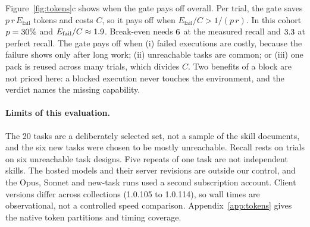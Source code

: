 Figure~\ref{fig:tokens}c shows when the gate pays off overall. Per trial, the
gate saves $p\,r\,E_{\mathrm{fail}}$ tokens and costs $C$, so it pays off when
$E_{\mathrm{fail}}/C > 1/(p\,r)$. In this cohort $p=30\%{}$ and
$E_{\mathrm{fail}}/C \approx 1.9$. Break-even needs
$6$ at the measured recall and $3.3$ at
perfect recall. The gate pays off when (i) failed executions are costly,
because the failure shows only after long work; (ii) unreachable tasks are
common; or (iii) one pack is reused across many trials, which divides $C$.
Two benefits of a block are not priced here: a blocked execution never
touches the environment, and the verdict names the missing capability.

\paragraph{Limits of this evaluation.}
The 20 tasks are a deliberately selected set, not a sample of the
\PilotSourceCount{} skill documents, and the six new tasks were chosen to be
mostly unreachable. Recall rests on \ValueFailed{} trials on six unreachable
task designs. Five repeats of one task are not independent skills. The hosted
models and their server revisions are outside our control, and the Opus,
Sonnet and new-task runs used a second subscription account. Client versions differ
across collections (1.0.105 to 1.0.114), so wall times are observational, not
a controlled speed comparison. Appendix~\ref{app:tokens} gives the native
token partitions and timing coverage.

\FloatBarrier
